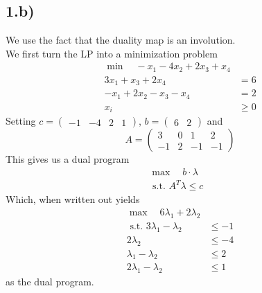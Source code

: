 \documentclass[11pt, a4paper]{article}
\begin{document}
\subsection*{1.b)}
We use the fact that the duality map is an involution.\\
We first turn the LP into a minimization problem
\begin{align*}
	\min \quad-x_1 - 4x_2 + 2 x_3 + x_4&\\
	3x_1 + x_3 + 2x_4 &=6\\
	-x_1 + 2x_2 - x_3 - x_4 &= 2\\
	x_i &\geq 0
\end{align*}
Setting $c= \begin{pmatrix}
	-1 & -4 & 2 & 1
\end{pmatrix} $, $ b= \begin{pmatrix}
 6 &2
\end{pmatrix} $ and
\[ 
A = 
\begin{pmatrix}
	3 & 0 & 1 & 2 \\
	-1 & 2 & -1  & -1
\end{pmatrix} 
\]
This gives us a dual program
\begin{align*}
	\max \quad b\cdot \lambda &\\
	\text{ s.t. } A^{T}\lambda \leq c
\end{align*}
Which, when written out yields
\begin{align*}
	\max\quad 6\lambda_1 + 2 \lambda_2&\\
	\text{ s.t. } 3\lambda_1 - \lambda_2 & \leq -1\\
	2\lambda_2 &\leq -4\\
	\lambda_1 - \lambda_2 &\leq 2\\
	2\lambda_1 - \lambda_2 &\leq  1
\end{align*}
as the dual program.
\end{document}

